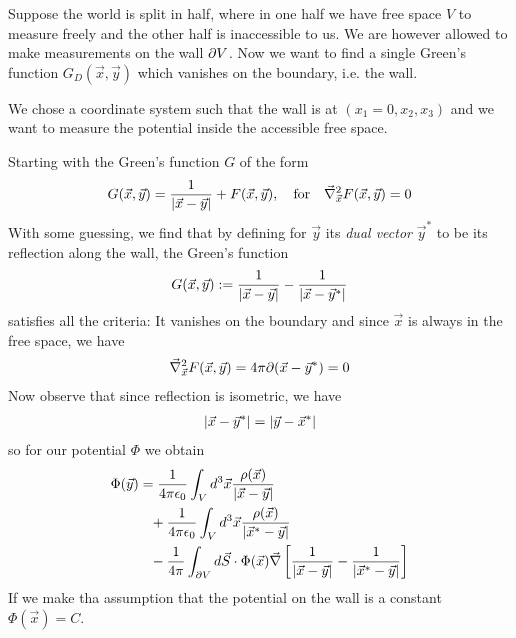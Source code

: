 \begin{ex}
  Suppose the world is split in half, where in one half we have free space $V$ to measure freely and the other half is inaccessible to us.
  We are however allowed to make measurements on the wall $\partial V$.
  Now we want to find a single Green's function $G_D(\vec{x},\vec{y})$ which vanishes on the boundary, i.e. the wall.

  We chose a coordinate system such that the wall is at $(x_1 = 0,x_2,x_3)$ and we want to measure the potential inside the accessible free space.
  
  Starting with the Green's function $G$ of the form
  \begin{align*}
  G(\vec{x},\vec{y}) = \frac{1}{\vert\vec{x} - \vec{y}\vert} + F(\vec{x},\vec{y}), \quad \text{for} \quad \vec{\nabla}_{\vec{x}}^{2}F(\vec{x},\vec{y}) = 0
  \end{align*}
  With some guessing, we find that by defining for $\vec{y}$ its \emph{dual vector} $\vec{y}^{\ast}$ to be its reflection along the wall, the Green's function
  \begin{align*}
    G(\vec{x},\vec{y}) := \frac{1}{\vert\vec{x} - \vec{y}\vert} - \frac{1}{\vert\vec{x}- \vec{y}^{\ast}\vert}    
  \end{align*}
  satisfies all the criteria:
  It vanishes on the boundary and since $\vec{x}$ is always in the free space, we have
  \begin{align*}
    \vec{\nabla}_{\vec{x}}^{2} F(\vec{x},\vec{y}) = 4 \pi \partial(\vec{x} - \vec{y}^{\ast}) = 0
  \end{align*}
  Now observe that since reflection is isometric, we have
  \begin{align*}
    \vert\vec{x} - \vec{y}^{\ast}\vert = \vert\vec{y} - \vec{x}^{\ast}\vert
  \end{align*}
  so for our potential $\Phi$ we obtain
  \begin{align*}
    \Phi(\vec{y})
    &=
    \frac{1}{4 \pi \epsilon_0} \int_Vd^{3} \vec{x} \frac{\rho(\vec{x})}{\vert\vec{x} - \vec{y}\vert}\\
    &\phantom{=} + \frac{1}{4 \pi \epsilon_0} \int_Vd^{3} \vec{x} \frac{\rho(\vec{x})}{\vert\vec{x}^{\ast} - \vec{y}\vert}\\
    &\phantom{=} - \frac{1}{4 \pi} \int_{\partial V}d \vec{S} \cdot \Phi(\vec{x}) 
    \vec{\nabla} \left[
      \frac{1}{\vert\vec{x}- \vec{y}\vert} - \frac{1}{\vert\vec{x}^{\ast}- \vec{y}\vert}
    \right]
  \end{align*}
  If we make tha assumption that the potential on the wall is a constant $\Phi(\vec{x}) = C$.

\end{ex}
